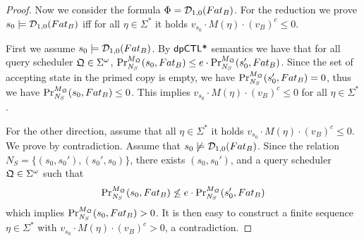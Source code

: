\begin{proof}
Now we consider the formula  $\Phi = \dpriv{1}{0} (F at_B)$. For the reduction we prove $s_0\models \dpriv{1}{0} (F at_B)$ iff for all $\eta\in\Sigma^*$ it holds $v_{s_0}\cdot M(\eta)\cdot (v_B)^c \leq 0$.

First we assume $s_0\models \dpriv{1}{0} (F at_B)$. By $\dpCTLstar$ semantics we have that for all query scheduler $\scheduler{Q}\in\Sigma^\omega$,
$\myPr{s_0}{M_{\scheduler{Q}}}{\neighbor{S}}{F at_B} \leq
  e \cdot
  \myPr{s_0'}{M_{\scheduler{Q}}}{\neighbor{S}}{F at_B}$. Since the set of accepting state in the primed copy is empty, we have $\myPr{s_0'}{M_{\scheduler{Q}}}{\neighbor{S}}{F at_B}=0$, thus we have
$\myPr{s_0}{M_{\scheduler{Q}}}{\neighbor{S}}{F at_B} \leq
 0$. This implies  $v_{s_0}\cdot M(\eta)\cdot (v_B)^c \leq 0$ for all $\eta\in\Sigma^*$.

 For the other direction, assume that all $\eta\in\Sigma^*$ it holds $v_{s_0}\cdot M(\eta)\cdot (v_B)^c \leq 0$. We prove by contradiction. Assume that $s_0\not\models \dpriv{1}{0} (F at_B)$. Since the relation $N_S=\{(s_0,s_0'),(s_0',s_0)\}$, there exists $(s_0,s_0')$,
  and a query scheduler $\scheduler{Q}\in\Sigma^\omega$ such that 
 \[
 \myPr{s_0}{M_{\scheduler{Q}}}{\neighbor{S}}{F at_B} \not\leq
  e \cdot
  \myPr{s_0'}{M_{\scheduler{Q}}}{\neighbor{S}}{F at_B}
 \]
 which implies $\myPr{s_0}{M_{\scheduler{Q}}}{\neighbor{S}}{F at_B} >0$. It is then easy to construct a finite sequence $\eta\in\Sigma^*$ with  $v_{s_0}\cdot M(\eta)\cdot (v_B)^c > 0$, a contradiction.
\end{proof}
